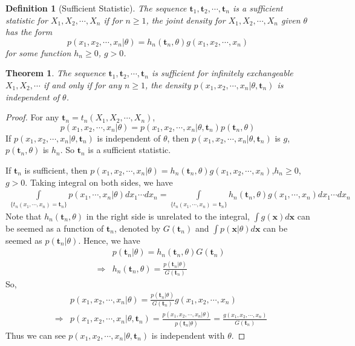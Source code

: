 \documentclass[11pt]{article}
\def\t{{\bm t}}
\def\x{{\bm x}}
\newtheorem{theorem}{Theorem}[section]
\newtheorem{definition}{Definition}[section]
\begin{document}
\begin{definition}[Sufficient Statistic]
The sequence $\t_1, \t_2, \cdots, \t_n$ is a sufficient statistic for $X_1, X_2, \cdots, X_n$ if for $n\geq1$, the joint density for $X_1, X_2, \cdots, X_n$ given $\theta$ has the form
$$
p(x_1, x_2, \cdots, x_n|\theta) = h_n(\t_n, \theta)g(x_1, x_2, \cdots, x_n)
$$
for some function $h_n\geq 0$, $g>0$.
\end{definition}
\begin{theorem}
The sequence  $\t_1, \t_2, \cdots, \t_n$ is sufficient for infinitely exchangeable $X_1, X_2, \cdots$ if and only if for any $n\geq 1$, the density $p(x_1, x_2, \cdots, x_n|\theta, \t_n)$ is independent of $\theta$.
\end{theorem}
\begin{proof}
For any $\t_n=t_n(X_1, X_2, \cdots, X_n)$,
$$
p(x_1, x_2, \cdots, x_n|\theta) = p(x_1, x_2, \cdots, x_n|\theta, \t_n)p(\t_n, \theta)
$$
If $p(x_1, x_2, \cdots, x_n|\theta, \t_n)$ is independent of $\theta$, then  $p(x_1, x_2, \cdots, x_n|\theta, \t_n)$  is $g$, $p(\t_n, \theta)$ is $h_n$. So $\t_n$ is a sufficient statistic.

If $\t_n$ is sufficient, then $p(x_1, x_2, \cdots, x_n|\theta) = h_n(\t_n, \theta)g(x_1, x_2, \cdots, x_n)$,$h_n\geq 0$, $g>0$. Taking integral on both sides, we have
\begin{eqnarray*}
\int\limits_{\{t_n(x_1, \cdots, x_n)=\t_n\}}p(x_1, \cdots, x_n|\theta)dx_1\cdots dx_n = \int\limits_{\{t_n(x_1, \cdots, x_n)=\t_n\}}h_n(\t_n, \theta)g(x_1, \cdots, x_n)dx_1\cdots dx_n
\end{eqnarray*}
Note that $h_n(\t_n, \theta)$ in the right side is unrelated to the integral, $\int g(\x) d\x$ can be seemed as a function of $\t_n$, denoted by $G(\t_n)$ and $\int p(\x|\theta) d\x$ can be seemed as $p(\t_n|\theta)$. Hence, we have 
\begin{eqnarray*}
&&p(\t_n|\theta) = h_n(\t_n, \theta)G(\t_n)\\
&\Longrightarrow&h_n(\t_n, \theta)=\frac{p(\t_n|\theta)}{G(\t_n)}
\end{eqnarray*}
So,
\begin{eqnarray*}
&&p(x_1, x_2, \cdots, x_n|\theta) = \frac{p(\t_n|\theta)}{G(\t_n)}g(x_1, x_2, \cdots, x_n) \\
&\Longrightarrow& p(x_1, x_2, \cdots, x_n|\theta, \t_n) = \frac{p(x_1, x_2, \cdots, x_n|\theta)}{p(\t_n|\theta)} = \frac{g(x_1, x_2, \cdots, x_n)}{G(\t_n)}
\end{eqnarray*}
Thus we can see $p(x_1, x_2, \cdots, x_n|\theta, \t_n)$ is independent with $\theta$.
\end{proof}
\end{document}
